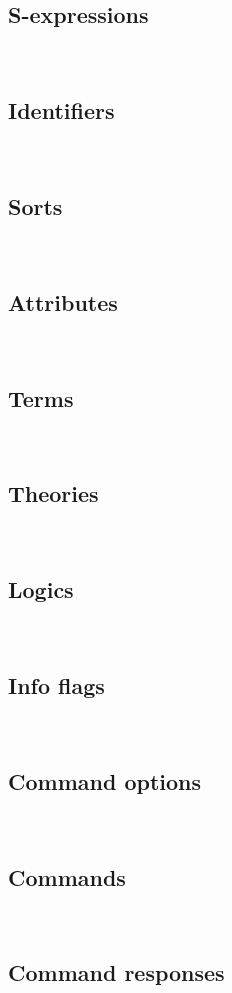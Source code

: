 {\subsection*{S-expressions}
\ 

\sexpressions


\subsection*{Identifiers}
\ 

\cIdentifiers

\newpage
\subsection*{Sorts}
\ 

\cSorts
\medskip


\subsection*{Attributes}
\ 

\cAttributes
\medskip


\subsection*{Terms}
\ 

\cTerms

\newpage
\subsection*{Theories}
\ 

\cTheories
\medskip

\subsection*{Logics}
\ 

\cLogics
\medskip

\newpage
\subsection*{Info flags}
\ 

\cInfoFlags
\medskip

\subsection*{Command options}
\ 

\cCommandOptions

\newpage
\subsection*{Commands}
\ 

\cCommands

\newpage
\subsection*{Command responses}
\ 

\cResponsesI

\cResponsesII
}



